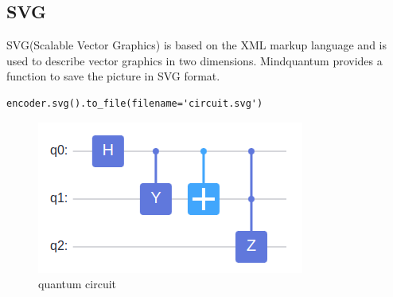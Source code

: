 \subsection{SVG}
SVG(Scalable Vector Graphics) is based on the XML markup language and is used to describe vector graphics in two dimensions. Mindquantum provides a function to save the picture in SVG format.
\begin{lstlisting}
encoder.svg().to_file(filename='circuit.svg')
\end{lstlisting}
\begin{figure}[h]
    \begin{center}
        \includegraphics[width=0.5\linewidth]{images/2_4_circuit.png}
    \end{center}
    \caption{quantum circuit}
\end{figure}
